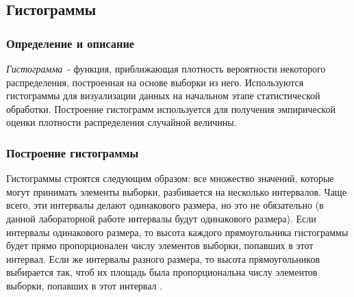 \subsection{Гистограммы}

\subsubsection{Определение и описание}
\textit{Гистограмма}\ - функция, приближающая плотность вероятности некоторого распределения, построенная на основе выборки из него. Используются гистограммы для визуализации данных на начальном этапе статистической обработки. Построение гистограмм используется для получения эмпирической оценки плотности распределения случайной величины.

\subsubsection{Построение гистограммы}
Гистограммы строятся следующим образом: все множество значений, которые могут принимать элементы выборки, разбивается на несколько интервалов. Чаще всего, эти интервалы делают одинакового размера, но это не обязательно (в данной лабораторной работе интервалы будут одинакового размера). Если интервалы одинакового размера, то высота каждого прямоугольника гистограммы будет прямо пропорционален числу элементов выборки, попавших в этот интервал. Если же интервалы разного размера, то высота прямоугольников выбирается так, чтоб их площадь была пропорциональна числу элементов выборки, попавших в этот интервал \cite{litlink1}.
